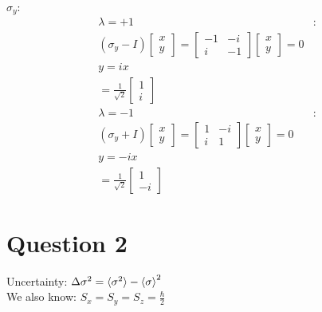 \documentclass[12pt]{article}
\begin{document}
 $\sigma_y$:
\begin{equation}
\begin{split}
\lambda = +1 &: \\
(\sigma_y - I)
\begin{bmatrix}
x \\ y
\end{bmatrix}
=
\begin{bmatrix}
-1 & -i \\
i & -1
\end{bmatrix}
\begin{bmatrix}
x \\ y
\end{bmatrix}
= 0 \\
y = i x \\
= \frac{1}{\sqrt{2}}
\begin{bmatrix}
1 \\ i
\end{bmatrix}
\\[6pt]
\lambda = -1 &: \\
(\sigma_y + I)
\begin{bmatrix}
x \\ y
\end{bmatrix}
=
\begin{bmatrix}
1 & -i \\
i & 1
\end{bmatrix}
\begin{bmatrix}
x \\ y
\end{bmatrix}
= 0 \\y = -i x \\
= \frac{1}{\sqrt{2}}
\begin{bmatrix}
1 \\ -i
\end{bmatrix}
\end{split}
\end{equation}

\newpage
\section*{Question 2}

Uncertainty: $\Delta\sigma^2 = \braket{\sigma^2} - \braket{\sigma}^2 $ \\
We also know: $S_x = S_y = S_z = \frac{\hbar}{2}$ \\
\end{document}

